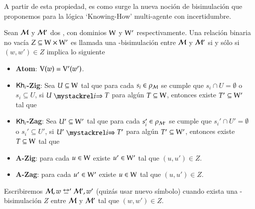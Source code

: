 A partir de esta propiedad, es como surge la nueva noción de bisimulación que proponemos para la lógica `Knowing-How' multi-agente con 
incertidumbre.

\begin{definicion}
    Sean $\mathcal{M}$ y $\mathcal{M}'$ dos \ultss, con dominios $\mathrm{W}$ y $\mathrm{W}'$ respectivamente.
    Una relación binaria no vacía $Z \subseteq \mathrm{W} \times \mathrm{W}'$ es llamada una \KHilogic-bisimulación entre $\mathcal{M}$ y 
    $\mathcal{M}'$ si y sólo si $(w,w') \in Z$ implica lo siguiente
    \begin{itemize}
        \item \textbf{Atom}: $\mathrm{V}(w)=\mathrm{V}'(w')$.

        \item \textbf{$\mathsf{Kh}_i$-Zig}: Sea $U \subseteq \mathrm{W}$ tal que para cada $s_i \in \rho_{\mathcal{M}}$ se cumple que $s_i \cap U = \emptyset$ o $s_i \subseteq U$, si $U \ultsExecAgi T$ para algún $T \subseteq \mathrm{W}$, entonces existe $T' \subseteq \mathrm{W}'$ tal que
        \begin{multicols}{2}
        \end{multicols}
        
        \item \textbf{$\mathsf{Kh}_i$-Zag}: Sea $U' \subseteq \mathrm{W}'$ tal que para cada $s_i' \in \rho_{\mathcal{M}'}$ se cumple que $s_i' \cap U' = \emptyset$ o $s_i' \subseteq U'$, si $U' \ultsExecAgi T'$ para algún $T' \subseteq \mathrm{W}'$, entonces existe $T \subseteq \mathrm{W}$ tal que
        \begin{multicols}{2}
        \end{multicols}

        \item \textbf{A-Zig}: para cada $u \in \mathrm{W}$ existe $u' \in \mathrm{W}'$ tal que $(u,u') \in Z$.

        \item \textbf{A-Zag}: para cada $u' \in \mathrm{W}'$ existe $u \in \mathrm{W}$ tal que $(u,u') \in Z$.
    \end{itemize} 

    Escribiremos $\modults,w \bisim' \modults',w'$ (quizás usar nuevo símbolo) cuando exista una \KHilogic-bisimulación $Z$ entre
    $\mathcal{M}$ y $\mathcal{M}'$ tal que $(w,w') \in Z$.
\end{definicion}

